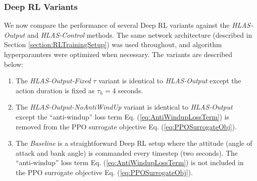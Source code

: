\documentclass{UnderReview}
\begin{document}
\subsubsection{Deep RL Variants}\label{section:shuttle_ablation_studies}
We now compare the performance of several Deep RL variants against the \textit{HLAS-Output} and \textit{HLAS-Control} methods.  The same network architecture (described in Section \ref{section:RLTrainingSetup}) was used throughout,  and algorithm hyperparamters were optimized when necessary.  The variants are described below:
\begin{enumerate}	
	\item The \textit{HLAS-Output-Fixed $\tau$} variant is identical to \textit{HLAS-Output} except the action duration is fixed as $\tau_h=4$ seconds.
	\item The \textit{HLAS-Output-NoAntiWindUp} variant is identical to \textit{HLAS-Output} except the ``anti-windup'' loss term Eq. (\ref{eq:AntiWindupLossTerm}) is removed from the PPO surrogate objective Eq. (\ref{eq:PPOSurrogateObj}).
	\item The \textit{Baseline} is a straightforward Deep RL setup where the attitude (angle of attack and bank angle) is commanded every timestep (two seconds).  The ``anti-windup'' loss term Eq. (\ref{eq:AntiWindupLossTerm}) is not included in the PPO surrogate objective Eq. (\ref{eq:PPOSurrogateObj}).
\end{enumerate}
\end{document}
